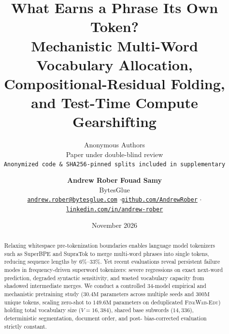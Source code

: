 \documentclass[11pt,a4paper]{article}
\title{\textbf{What Earns a Phrase Its Own Token?\\Mechanistic Multi-Word Vocabulary Allocation, Compositional-Residual Folding, and Test-Time Compute Gearshifting}}
\author{
  Anonymous Authors \\
  Paper under double-blind review \\
  \small\texttt{Anonymized code \& SHA256-pinned splits included in supplementary}
}
\author{
  \textbf{Andrew Rober Fouad Samy} \\
  BytesGlue \\
  \small\href{mailto:andrew.rober@bytesglue.com}{\texttt{andrew.rober@bytesglue.com}} \quad$\cdot$\quad \href{https://github.com/AndrewRober}{\texttt{github.com/AndrewRober}} \quad$\cdot$\quad \href{https://www.linkedin.com/in/andrew-rober/}{\texttt{linkedin.com/in/andrew-rober}}
}
\date{November 2026}
\begin{document}
\maketitle

\begin{abstract}
Relaxing whitespace pre-tokenization boundaries enables language model tokenizers such as SuperBPE and SupraTok to merge multi-word phrases into single tokens, reducing sequence lengths by $6\%$--$33\%$. Yet recent evaluations reveal persistent failure modes in frequency-driven superword tokenizers: severe regressions on exact next-word prediction, degraded syntactic sensitivity, and wasted vocabulary capacity from shadowed intermediate merges. We conduct a controlled 34-model empirical and mechanistic pretraining study ($30.4\text{M}$ parameters across multiple seeds and $300\text{M}$ unique tokens, scaling zero-shot to $149.6\text{M}$ parameters on deduplicated \textsc{FineWeb-Edu}) holding total vocabulary size ($V=16{,}384$), shared base subwords ($14{,}336$), deterministic segmentation, document order, and post-\citet{schaeffer2026myths} bias-corrected evaluation strictly constant.


\end{abstract}
\end{document}
